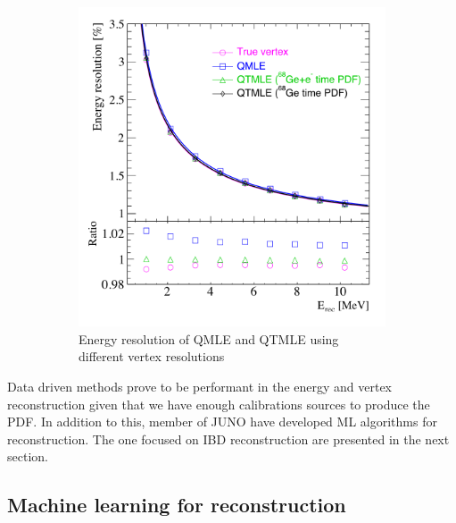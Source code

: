 \documentclass[../main.tex]{subfiles}
\begin{document}
\begin{figure}[ht]
\begin{subfigure}{0.48\linewidth}
    \includegraphics[width=\textwidth]{images/juno/reco/energy_qtmle.png}
    \caption{Energy resolution of QMLE and QTMLE using different vertex resolutions}
  \end{subfigure}
  \caption{}
  \label{fig:juno:rec:qtmle}
\end{figure}

Data driven methods prove to be performant in the energy and vertex reconstruction given that we have enough calibrations sources to produce the PDF. In addition to this, member of JUNO have developed ML algorithms for reconstruction. The one focused on IBD reconstruction are presented in the next section.

\subsection{Machine learning for reconstruction}
\label{sec:juno:ml}
\end{document}
